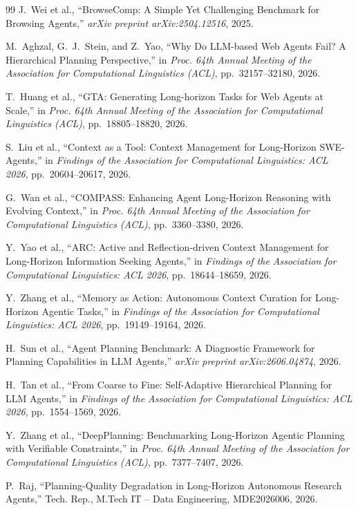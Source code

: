 \documentclass[conference]{IEEEtran}
\begin{document}
\begin{thebibliography}{99}
J.~Wei et al.,
``{BrowseComp}: A Simple Yet Challenging Benchmark for Browsing Agents,''
\textit{arXiv preprint arXiv:2504.12516}, 2025.

M.~Aghzal, G.~J.~Stein, and Z.~Yao,
``Why Do {LLM}-based Web Agents Fail? A Hierarchical Planning Perspective,''
in \textit{Proc. 64th Annual Meeting of the Association for Computational Linguistics (ACL)}, pp.~32157--32180, 2026.

T.~Huang et al.,
``{GTA}: Generating Long-horizon Tasks for Web Agents at Scale,''
in \textit{Proc. 64th Annual Meeting of the Association for Computational Linguistics (ACL)}, pp.~18805--18820, 2026.

S.~Liu et al.,
``Context as a Tool: Context Management for Long-Horizon {SWE}-Agents,''
in \textit{Findings of the Association for Computational Linguistics: ACL 2026}, pp.~20604--20617, 2026.

G.~Wan et al.,
``{COMPASS}: Enhancing Agent Long-Horizon Reasoning with Evolving Context,''
in \textit{Proc. 64th Annual Meeting of the Association for Computational Linguistics (ACL)}, pp.~3360--3380, 2026.

Y.~Yao et al.,
``{ARC}: Active and Reflection-driven Context Management for Long-Horizon Information Seeking Agents,''
in \textit{Findings of the Association for Computational Linguistics: ACL 2026}, pp.~18644--18659, 2026.

Y.~Zhang et al.,
``Memory as Action: Autonomous Context Curation for Long-Horizon Agentic Tasks,''
in \textit{Findings of the Association for Computational Linguistics: ACL 2026}, pp.~19149--19164, 2026.

H.~Sun et al.,
``Agent Planning Benchmark: A Diagnostic Framework for Planning Capabilities in {LLM} Agents,''
\textit{arXiv preprint arXiv:2606.04874}, 2026.

H.~Tan et al.,
``From Coarse to Fine: Self-Adaptive Hierarchical Planning for {LLM} Agents,''
in \textit{Findings of the Association for Computational Linguistics: ACL 2026}, pp.~1554--1569, 2026.

Y.~Zhang et al.,
``{DeepPlanning}: Benchmarking Long-Horizon Agentic Planning with Verifiable Constraints,''
in \textit{Proc. 64th Annual Meeting of the Association for Computational Linguistics (ACL)}, pp.~7377--7407, 2026.

P.~Raj,
``Planning-Quality Degradation in Long-Horizon Autonomous Research Agents,''
Tech. Rep., M.Tech IT -- Data Engineering, MDE2026006, 2026.

\end{thebibliography}
\end{document}
